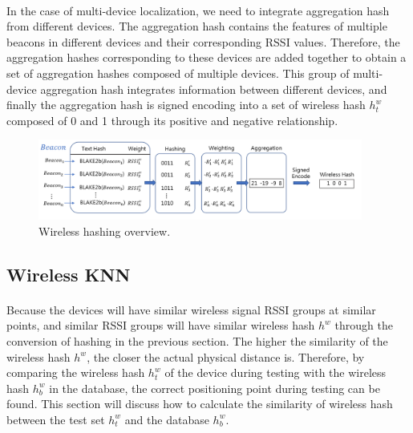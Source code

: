 \documentclass[a4paper,12pt]{report}
\begin{document}
\paragraph{}
In the case of multi-device localization, we need to integrate aggregation hash from different devices. The aggregation hash contains the features of multiple beacons in different devices and their corresponding RSSI values. Therefore, the aggregation hashes corresponding to these devices are added together to obtain a set of aggregation hashes composed of multiple devices. This group of multi-device aggregation hash integrates information between different devices, and finally the aggregation hash is signed encoding into a set of wireless hash $h_t^{w}$ composed of 0 and 1 through its positive and negative relationship.
%

\begin{figure}[tbph]
    \begin{center}
    \includegraphics[width=0.95\textwidth]{images/3_3_Wireless_Hash.png}
    \caption{Wireless hashing overview.}
    \label{figure:3_3_Wireless_Hash}
    \end{center}
\end{figure}

\subsection{Wireless KNN}

\paragraph{}
Because the devices will have similar wireless signal RSSI groups at similar points, and similar RSSI groups will have similar wireless hash $h^{w}$ through the conversion of hashing in the previous section. The higher the similarity of the wireless hash $h^{w}$, the closer the actual physical distance is. Therefore, by comparing the wireless hash $h_t^{w}$ of the device during testing with the wireless hash $h_b^{w}$ in the database, the correct positioning point during testing can be found. This section will discuss how to calculate the similarity of wireless hash between the test set $h_t^{w}$ and the database $h_b^{w}$.
%
\end{document}
